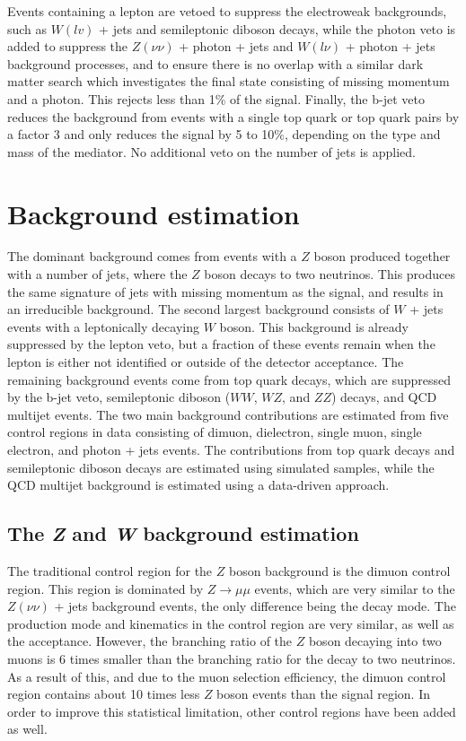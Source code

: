 Events containing a lepton are vetoed to suppress the electroweak backgrounds, such as $W(lv)$ + jets and semileptonic diboson decays, while the photon veto is added to suppress the $Z(\nu\nu)$ + photon + jets and $W(l\nu)$ + photon + jets background processes, and to ensure there is no overlap with a similar dark matter search which investigates the final state consisting of missing momentum and a photon. This rejects less than 1\% of the signal. Finally, the b-jet veto reduces the background from events with a single top quark or top quark pairs by a factor 3 and only reduces the signal by 5 to 10\%, depending on the type and mass of the mediator. No additional veto on the number of jets is applied.

\section{Background estimation}
\label{sec:bkgd}

% 

The dominant background comes from events with a $Z$ boson produced together with a number of jets, where the $Z$ boson decays to two neutrinos. This produces the same signature of jets with missing momentum as the signal, and results in an irreducible background. The second largest background consists of $W$ + jets events with a leptonically decaying $W$ boson. This background is already suppressed by the lepton veto, but a fraction of these events remain when the lepton is either not identified or outside of the detector acceptance. The remaining background events come from top quark decays, which are suppressed by the b-jet veto, semileptonic diboson ($WW$, $WZ$, and $ZZ$) decays, and QCD multijet events. The two main background contributions are estimated from five control regions in data consisting of dimuon, dielectron, single muon, single electron, and photon + jets events.  The contributions from top quark decays and semileptonic diboson decays are estimated using simulated samples, while the QCD multijet background is estimated using a data-driven approach.

\subsection{The \textit{Z} and \textit{W} background estimation}
\label{sec:main_bkgd}

The traditional control region for the $Z$ boson background is the dimuon control region. This region is dominated by $Z\rightarrow\mu\mu$ events, which are very similar to the $Z(\nu\nu)$ + jets background events, the only difference being the decay mode. The production mode and kinematics in the control region are very similar, as well as the acceptance. However, the branching ratio of the $Z$ boson decaying into two muons is 6 times smaller than the branching ratio for the decay to two neutrinos. As a result of this, and due to the muon selection efficiency, the dimuon control region contains about 10 times less $Z$ boson events than the signal region. In order to improve this statistical limitation, other control regions have been added as well.


